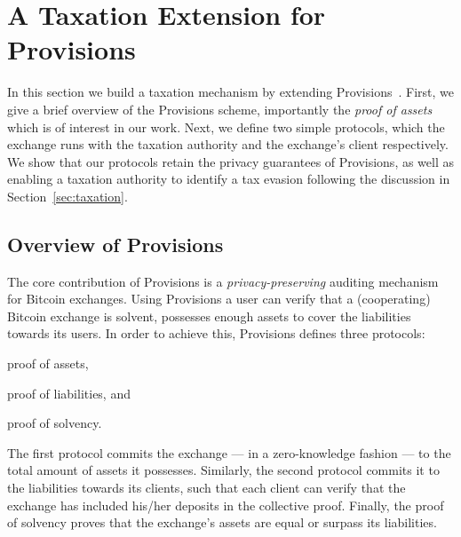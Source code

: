 \section{A Taxation Extension for Provisions}\label{sec:provisions-extension}

In this section we build a taxation mechanism by extending
Provisions~\cite{CCS:DBBCB15}. First, we give a brief overview of the
Provisions scheme, importantly the \emph{proof of assets} which is of interest
in our work. Next, we define two simple protocols, which the exchange runs with
the taxation authority and the exchange's client respectively. We show that our
protocols retain the privacy guarantees of Provisions, as well as enabling a
taxation authority to identify a tax evasion following the discussion in
Section~\ref{sec:taxation}.

\subsection{Overview of Provisions}\label{subsec:provisions-overview}

The core contribution of Provisions is a \emph{privacy-preserving} auditing
mechanism for Bitcoin exchanges. Using Provisions a user can verify that a
(cooperating) Bitcoin exchange is solvent, \ie possesses enough assets to cover
the liabilities towards its users. In order to achieve this, Provisions defines
three protocols:
\begin{inparaenum}[i)]
    \item proof of assets,
    \item proof of liabilities, and
    \item proof of solvency.
\end{inparaenum}
The first protocol commits the exchange --- in a zero-knowledge fashion --- to
the total amount of assets it possesses. Similarly, the second protocol commits
it to the liabilities towards its clients, such that each client can verify
that the exchange has included his/her deposits in the collective proof.
Finally, the proof of solvency proves that the exchange's assets are equal or
surpass its liabilities.

